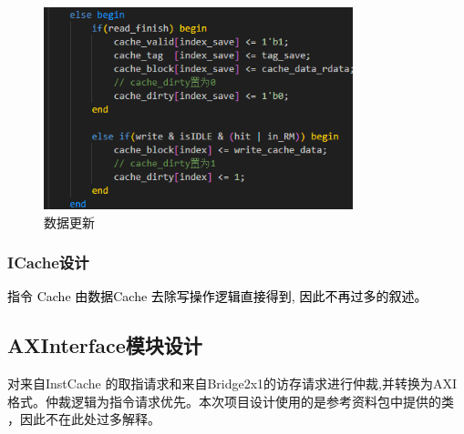 \begin{flushleft}
\begin{figure}[htbp]
    \centering
    \includegraphics[width=0.8\textwidth]{image/cacheR.png}
    \caption{数据更新}
\end{figure}

\newpage
\subsubsection{ICache设计}
\textcolor{black}{指令 Cache 由数据Cache 去除写操作逻辑直接得到, 因此不再过多的叙述。}
\end{flushleft}



\begin{flushleft}
\subsection{AXInterface模块设计}
对来自InstCache 的取指请求和来自Bridge2x1的访存请求进行仲裁,并转换为AXI格式。仲裁逻辑为指令请求优先。本次项目设计使用的是参考资料包中提供的类 ，因此不在此处过多解释。
\end{flushleft}
